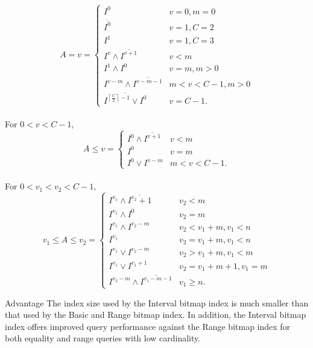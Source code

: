 \documentclass[../main/thesis.tex]{subfiles}
\begin{document}
\begin{equation}
\label{eq:intervalbi_query_equality}
A=v= 
\begin{cases}
I^0 & v=0,m=0 \\
\overline{I^0} & v=1,C=2 \\
I^1 & v=1,C=3 \\
I^v \wedge \overline{I^{v+1}} & v<m \\
I^1 \wedge I^0 & v=m,m>0 \\
I^{v-m} \wedge \overline{I^{v-m-1}} & m<v<C-1,m>0 \\
\overline{I^{ \left\lceil \frac{C}{2} \right\rceil -1} \vee I^0} & v=C-1.
\end{cases}
\end{equation}
\\
For $0<v<C-1$,
\begin{equation}
\label{eq:intervalbi_query_oneside}
A\leq v = 
\begin{cases}
I^0 \wedge \overline{I^{v+1}} & v < m \\
I^0 & v=m \\
I^0 \vee I^{v-m} & m < v < C-1.
\end{cases}
\end{equation}
\\
For $0<v_1<v_2<C-1$,
\begin{equation}
\label{eq:intervalbi_query_twoside}
v_1 \leq A \leq v_2 = 
\begin{cases}
I^{v_1} \wedge \overline{I^{v_2}+1} & v_2<m \\
I^{v_1} \wedge I^0 & v_2=m \\
I^{v_1} \wedge I^{v_2-m} & v_2<v_1+m,v_1<n \\
I^{v_1} & v_2=v_1+m,v_1<n \\
I^{v_1} \vee I^{v_2-m} & v_2>v_1+m,v_1<m \\
I^{v_1} \vee I^{v_1+1} & v_2=v_1+m+1,v_1=m \\
I^{v_2-m} \wedge \overline{I^{v_1-m-1}} & v_1 \geq n.
\end{cases}
\end{equation}

\begin{prosNcons}{Advantage}
	The index size used by the Interval bitmap index is much smaller than that used by the Basic and Range bitmap index. In addition, the Interval bitmap index offers improved query performance against the Range bitmap index for both equality and range queries with low cardinality.
\end{prosNcons}
\end{document}
